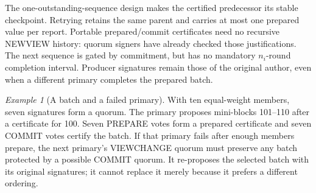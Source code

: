 \documentclass[11pt,a4paper,onecolumn]{article}
\theoremstyle{remark}\newtheorem{example}[definition]{Example}
\begin{document}
The one-outstanding-sequence design makes the certified predecessor its stable
checkpoint. Retrying retains the same parent and carries at most one prepared
value per report. Portable prepared/commit certificates need no recursive
NEWVIEW history: quorum signers have already checked those justifications.
The next sequence is gated by commitment, but has no mandatory $n_i$-round
completion interval. Producer signatures remain those of the original author,
even when a different primary completes the prepared batch.

\begin{example}[A batch and a failed primary]
With ten equal-weight members, seven signatures form a quorum. The primary
proposes mini-blocks 101--110 after a certificate for 100. Seven PREPARE votes
form a prepared certificate and seven COMMIT votes certify the batch. If that
primary fails after enough members prepare, the next primary's VIEWCHANGE
quorum must preserve any batch protected by a possible COMMIT quorum. It
re-proposes the selected batch with its original signatures; it cannot replace
it merely because it prefers a different ordering.
\end{example}

\Needspace{.95\textheight}
\end{document}

